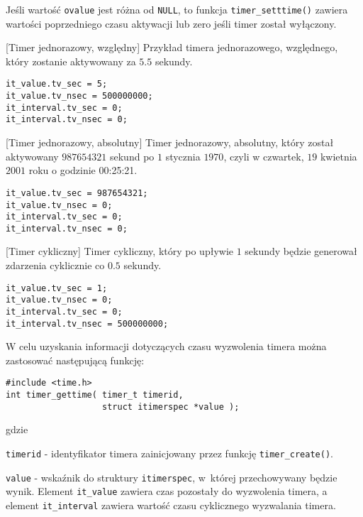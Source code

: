 Jeśli wartość \lstinline[style=MyCStyle]{ovalue} jest różna od \lstinline[style=MyCStyle]{NULL}, to funkcja \lstinline[style=MyCStyle]{timer_setttime()} zawiera wartości poprzedniego czasu aktywacji lub zero jeśli timer został wyłączony.

\begin{example}{[Timer jednorazowy, względny]}
Przykład timera jednorazowego, względnego, który zostanie aktywowany za $5.5$ sekundy.
\begin{lstlisting}[style=MyCStyle]
it_value.tv_sec = 5;
it_value.tv_nsec = 500000000;
it_interval.tv_sec = 0;
it_interval.tv_nsec = 0;
\end{lstlisting}
\end{example}

\begin{example}{[Timer jednorazowy, absolutny]}
Timer jednorazowy, absolutny, który został aktywowany $987654321$ sekund po $1$ stycznia $1970$, czyli w czwartek, $19$ kwietnia $2001$ roku o godzinie 00:25:21.
\begin{lstlisting}[style=MyCStyle]
it_value.tv_sec = 987654321;
it_value.tv_nsec = 0;
it_interval.tv_sec = 0;
it_interval.tv_nsec = 0;
\end{lstlisting}
\end{example}

\begin{example}{[Timer cykliczny]}
Timer cykliczny, który po upływie $1$ sekundy będzie generował zdarzenia cyklicznie co $0.5$ sekundy.
\begin{lstlisting}[style=MyCStyle]
it_value.tv_sec = 1;
it_value.tv_nsec = 0;
it_interval.tv_sec = 0;
it_interval.tv_nsec = 500000000;
\end{lstlisting}
\end{example}

W celu uzyskania informacji dotyczących czasu wyzwolenia timera można zastosować następującą funkcję:

\begin{lstlisting}[style=MyCStyle]
#include <time.h>
int timer_gettime( timer_t timerid,
                   struct itimerspec *value );
\end{lstlisting}

\noindent
gdzie

\begin{myitemize}
\item[] \lstinline[style=MyCStyle]{timerid} - identyfikator timera zainicjowany przez funkcję \lstinline[style=MyCStyle]{timer_create()}.
\item[] \lstinline[style=MyCStyle]{value} - wskaźnik do struktury \lstinline[style=MyCStyle]{itimerspec}, w~której przechowywany będzie wynik. Element \lstinline[style=MyCStyle]{it_value} zawiera czas pozostały do wyzwolenia timera, a element \lstinline[style=MyCStyle]{it_interval} zawiera wartość czasu cyklicznego wyzwalania timera.
\end{myitemize}

